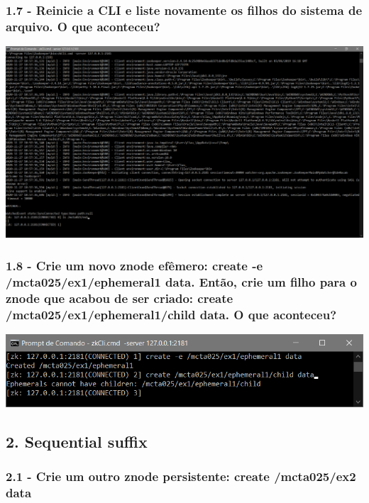 \subsubsection{1.7 - Reinicie a CLI e liste novamente os filhos do sistema de arquivo. O que aconteceu?}

\includegraphics[width=20cm]{pratica3/prints/roteiro 1.7.PNG}

\subsubsection{1.8 - Crie um novo znode efêmero: create -e /mcta025/ex1/ephemeral1 data. Então, crie um filho para o znode que acabou de ser criado: create /mcta025/ex1/ephemeral1/child data. O que aconteceu?}

\includegraphics{pratica3/prints/roteiro 1.8.PNG}

\subsection*{2. Sequential suffix}

\subsubsection{2.1 - Crie um outro znode persistente: create /mcta025/ex2 data}

